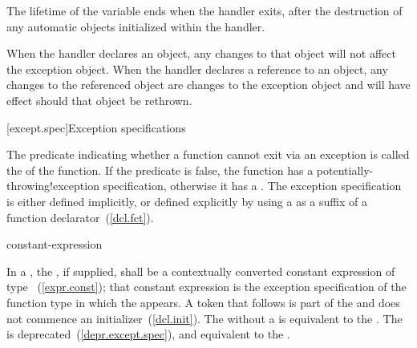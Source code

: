 The lifetime of the variable ends
when the handler exits, after the
destruction of any automatic objects initialized
within the handler.

\pnum
When the handler declares an object,
any changes to that object will not affect the exception object.
When the handler declares a reference to an object,
any changes to the referenced object are changes to the
exception object and will have effect should that object be rethrown.%
%

[except.spec]{Exception specifications}%

\pnum
The predicate indicating whether a function cannot exit via an exception
is called the  of the function.
If the predicate is false,
the function has a
%
%
{potentially-throwing!exception specification},
otherwise it has a
%
.
The exception specification is either defined implicitly,
or defined explicitly
by using a 
as a suffix of a function declarator~(\ref{dcl.fct}).

\begin{bnf}
\br
     \terminal{(} constant-expression \terminal{)}\br
     \terminal{(} \terminal{)}
\end{bnf}

\pnum
{}%
In a , the ,
if supplied, shall be a contextually converted constant expression
of type ~(\ref{expr.const});
that constant expression is the exception specification of
the function type in which the  appears. 
A \tcode{(} token that follows  is part of the
 and does not commence an
initializer~(\ref{dcl.init}).
The  
without a 
is
equivalent to the 
.
The  
is deprecated~(\ref{depr.except.spec}), and
equivalent to the 
.

